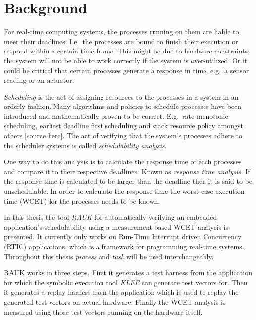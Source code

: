 \section{Background}
For real-time computing systems, the processes running on them are liable to
meet their deadlines. I.e.\ the processes are bound to finish their execution
or respond within a certain time frame. This might be due to hardware
constraints; the system will not be able to work correctly if the system is
over-utilized. Or it could be critical that certain processes generate a
response in time, e.g.\ a sensor reading or an actuator.

\emph{Scheduling} is the act of assigning resources to the processes in a
system in an orderly fashion. Many algorithms and policies to schedule
processes have been introduced and mathematically proven to be correct. E.g.\
rate-monotonic scheduling, earliest deadline first scheduling and stack
resource policy amongst others [source here]. The act of verifying that the
system's processes adhere to the scheduler systems is called 
\emph{schedulability analysis}.

One way to do this analysis is to calculate the response time of each processes
and compare it to their respective deadlines. Known as \emph{response time analysis}.
If the response time is calculated to be larger than the deadline then it is said
to be unschedulable. In order to calculate the response time the worst-case
execution time (WCET) for the processes needs to be known. 

In this thesis the tool \emph{RAUK} for automatically verifying an embedded 
application's schedulability using a measurement based WCET analysis is presented. 
It currently only works on Run-Time Interrupt driven Concurrency (RTIC) applications,
which is a framework for programming real-time systems. Throughout this thesis 
\emph{process} and \emph{task} will be used interchangeably.


RAUK works in three steps. First it generates a test harness from the application
for which the symbolic execution tool \emph{KLEE} can generate test vectors for. 
Then it generates a replay harness from the application which is used to replay
the generated test vectors on actual hardware. Finally the WCET analysis is
measured using those test vectors running on the hardware itself.

